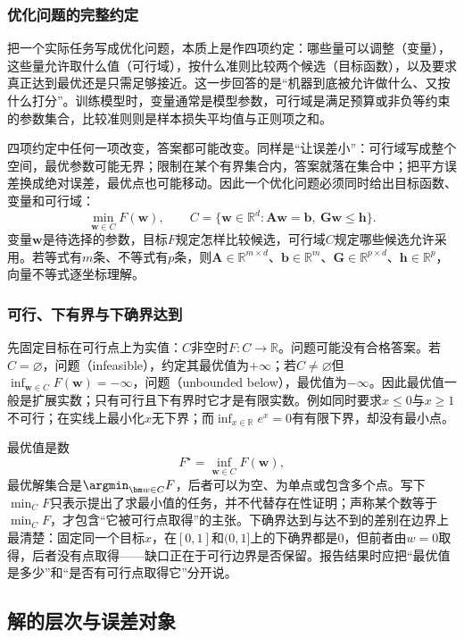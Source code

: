 \subsubsection{优化问题的完整约定}

把一个实际任务写成优化问题，本质上是作四项约定：哪些量可以调整（变量），这些量允许取什么值（可行域），按什么准则比较两个候选（目标函数），以及要求真正达到最优还是只需足够接近。这一步回答的是“机器到底被允许做什么、又按什么打分”。训练模型时，变量通常是模型参数，可行域是满足预算或非负等约束的参数集合，比较准则则是样本损失平均值与正则项之和。

四项约定中任何一项改变，答案都可能改变。同样是“让误差小”：可行域写成整个空间，最优参数可能无界；限制在某个有界集合内，答案就落在集合中；把平方误差换成绝对误差，最优点也可能移动。因此一个优化问题必须同时给出目标函数、变量和可行域：
\[
  \min_{\bm{w}\in C}F(\bm{w}),\qquad
  C=\{\bm{w}\in\mathbb{R}^d:
  \bm{A}\bm{w}=\bm{b},\ \bm{G}\bm{w}\leq\bm{h}\}.
\]
变量$\bm w$是待选择的参数，目标$F$规定怎样比较候选，可行域$C$规定哪些候选允许采用。若等式有$m$条、不等式有$p$条，则$\bm A\in\mathbb R^{m\times d}$、$\bm b\in\mathbb R^m$、$\bm G\in\mathbb R^{p\times d}$、$\bm h\in\mathbb R^p$，向量不等式逐坐标理解。

\subsubsection{可行、下有界与下确界达到}

先固定目标在可行点上为实值：$C$非空时$F:C\to\mathbb R$。问题可能没有合格答案。若$C=\varnothing$，问题（infeasible），约定其最优值为$+\infty$；若$C\neq\varnothing$但$\inf_{\bm w\in C}F(\bm w)=-\infty$，问题（unbounded below），最优值为$-\infty$。因此最优值一般是扩展实数；只有可行且下有界时它才是有限实数。例如同时要求$x\leq0$与$x\geq1$不可行；在实线上最小化$x$无下界；而$\inf_{x\in\mathbb R}e^x=0$有有限下界，却没有最小点。

最优值是数
\[
  F^\star=\inf_{\bm w\in C}F(\bm w),
\]
最优解集合是$\argmin_{\bm w\in C}F$，后者可以为空、为单点或包含多个点。写下$\min_C F$只表示提出了求最小值的任务，并不代替存在性证明；声称某个数等于$\min_C F$，才包含“它被可行点取得”的主张。下确界达到与达不到的差别在边界上最清楚：固定同一个目标$x$，在$[0,1]$和$(0,1]$上的下确界都是$0$，但前者由$w=0$取得，后者没有点取得——缺口正在于可行边界是否保留。报告结果时应把“最优值是多少”和“是否有可行点取得它”分开说。

\subsection{解的层次与误差对象}

